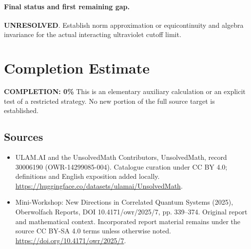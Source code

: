 \documentclass[11pt]{article}
\begin{document}
\paragraph{Final status and first remaining gap.}
\textbf{UNRESOLVED}. Establish norm approximation or equicontinuity and algebra invariance for the actual interacting ultraviolet cutoff limit.

\section{Completion Estimate}
\noindent\textbf{COMPLETION: 0\%}
This is an elementary auxiliary calculation or an explicit test of a restricted strategy. No new portion of the full source target is established.

\subsection{Sources}
\begin{itemize}
\item[\hypertarget{source:30006190:1}{S1}] ULAM.AI and the UnsolvedMath Contributors, UnsolvedMath, record 30006190 (OWR-14299085-004). Catalogue curation under CC BY 4.0; definitions and English exposition added locally.
\url{https://huggingface.co/datasets/ulamai/UnsolvedMath}.
\item[\hypertarget{source:30006190:2}{S2}] Mini-Workshop: New Directions in Correlated Quantum Systems (2025), Oberwolfach Reports, DOI 10.4171/owr/2025/7, pp. 339--374. Original report and mathematical context. Incorporated report material remains under the source CC BY-SA 4.0 terms unless otherwise noted.
\url{https://doi.org/10.4171/owr/2025/7}.
\end{itemize}
\label{end:30006190}
\end{document}
